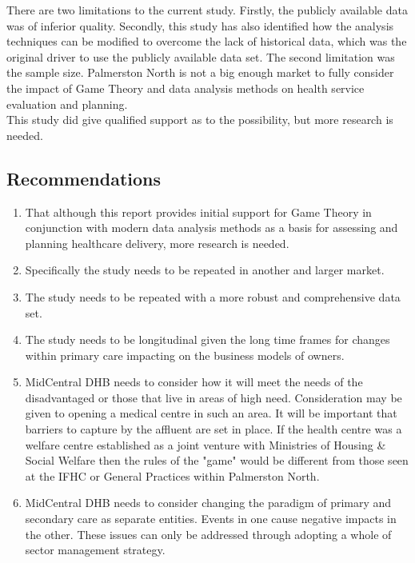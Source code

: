 \documentclass[11pt,a4paper]{article}
\begin{document}
There are two limitations to the current study. Firstly, the publicly available data was of inferior quality. Secondly, this study has also identified how the analysis techniques can be modified to overcome the lack of historical data, which was the original driver to use the publicly available data set. The second limitation was the sample size. Palmerston North is not a big enough market to fully consider the impact of Game Theory and data analysis methods on health service evaluation and planning.\\


This study did give qualified support as to the possibility, but more research is needed.\\


\subsection{Recommendations}
 
\begin{enumerate}
\item That although this report provides initial support for Game Theory in conjunction with modern data analysis methods as a basis for assessing and planning healthcare delivery, more research is needed.
\item Specifically the study needs to be repeated in another and larger market.
\item The study needs to be repeated with a more robust and comprehensive data set.
\item The study needs to be longitudinal given the long time frames for changes within primary care impacting on the business models of owners.
\item MidCentral DHB needs to consider how it will meet the needs of the disadvantaged or those that live in areas of high need. Consideration may be given to opening a medical centre in such an area. It will be important that barriers to capture by the affluent are set in place. If the health centre was a welfare centre established as a joint venture with Ministries of Housing \& Social Welfare then the rules of the "game" would be different from those seen at the IFHC or General Practices within Palmerston North.
\item MidCentral DHB needs to consider changing the paradigm of primary and secondary care as separate entities. Events in one cause negative impacts in the other. These issues can only be addressed through adopting a whole of sector management strategy. 
\end{enumerate}
\pagebreak
\end{document}
